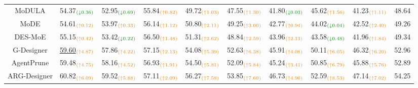 \documentclass[lettersize,journal]{IEEEtran}
\theoremstyle{plain}
\begin{document}
\begin{table}[!t]
\begin{tabular}{cccccccccc}
MoDULA & 54.37$_{\textcolor{mygreen}{(\downarrow 0.36)}}$ & 52.95$_{\textcolor{mygreen}{(\downarrow 0.69)}}$ & 55.84$_{\textcolor{orange}{(\uparrow 0.82)}}$ & 49.72$_{\textcolor{orange}{(\uparrow 1.03)}}$ & 47.55$_{\textcolor{orange}{(\uparrow 1.30)}}$ & 41.80$_{\textcolor{mygreen}{(\downarrow 0.03)}}$ & 45.62$_{\textcolor{orange}{(\uparrow 1.56)}}$ & 41.23$_{\textcolor{orange}{(\uparrow 1.11)}}$ & 48.64 \\
MoDE & 54.61$_{\textcolor{orange}{(\uparrow 0.12)}}$ & 53.97$_{\textcolor{orange}{(\uparrow 0.33)}}$ & 56.14$_{\textcolor{orange}{(\uparrow 1.12)}}$ & 50.80$_{\textcolor{orange}{(\uparrow 2.11)}}$ & 49.25$_{\textcolor{orange}{(\uparrow 3.00)}}$ & 42.77$_{\textcolor{orange}{(\uparrow 0.94)}}$ & 44.02$_{\textcolor{mygreen}{(\downarrow 0.04)}}$ & 42.52$_{\textcolor{orange}{(\uparrow 2.40)}}$ & 49.26 \\
DES-MoE & 55.15$_{\textcolor{orange}{(\uparrow 0.42)}}$ & 53.42$_{\textcolor{mygreen}{(\downarrow 0.22)}}$ & 56.50$_{\textcolor{orange}{(\uparrow 1.48)}}$ & 51.31$_{\textcolor{orange}{(\uparrow 2.62)}}$ & 48.84$_{\textcolor{orange}{(\uparrow 2.59)}}$ & 43.96$_{\textcolor{orange}{(\uparrow 2.13)}}$ & 43.58$_{\textcolor{mygreen}{(\downarrow 0.48)}}$ & 41.96$_{\textcolor{orange}{(\uparrow 1.84)}}$ & 49.34 \\ \hdashline
G-Designer & \underline{59.60}$_{\textcolor{orange}{(\uparrow 4.87)}}$ & 57.86$_{\textcolor{orange}{(\uparrow 4.22)}}$ & 57.15$_{\textcolor{orange}{(\uparrow 2.13)}}$ & 54.08$_{\textcolor{orange}{(\uparrow 5.39)}}$ & 52.63$_{\textcolor{orange}{(\uparrow 6.38)}}$ & 45.91$_{\textcolor{orange}{(\uparrow 4.08)}}$ & 50.11$_{\textcolor{orange}{(\uparrow 6.05)}}$ & 46.32$_{\textcolor{orange}{(\uparrow 6.20)}}$ & 52.96  \\
AgentPrune & 59.48$_{\textcolor{orange}{(\uparrow 4.75)}}$ & 58.16$_{\textcolor{orange}{(\uparrow 4.52)}}$ & 56.93$_{\textcolor{orange}{(\uparrow 1.91)}}$ & 54.50$_{\textcolor{orange}{(\uparrow 5.81)}}$ & 52.09$_{\textcolor{orange}{(\uparrow 5.84)}}$ & 45.24$_{\textcolor{orange}{(\uparrow 3.41)}}$ & 50.85$_{\textcolor{orange}{(\uparrow 6.79)}}$ & 45.88$_{\textcolor{orange}{(\uparrow 5.76)}}$ & 52.89  \\
ARG-Designer & 60.82$_{\textcolor{orange}{(\uparrow 6.09)}}$ & 59.52$_{\textcolor{orange}{(\uparrow 5.88)}}$ & 57.11$_{\textcolor{orange}{(\uparrow 2.09)}}$ & 56.27$_{\textcolor{orange}{(\uparrow 7.58)}}$ & 53.85$_{\textcolor{orange}{(\uparrow 7.60)}}$ & 46.73$_{\textcolor{orange}{(\uparrow 4.90)}}$ & 52.59$_{\textcolor{orange}{(\uparrow 8.53)}}$ & 47.14$_{\textcolor{orange}{(\uparrow 7.02)}}$ & 54.25 \\

\end{tabular}
\end{table}
\end{document}
